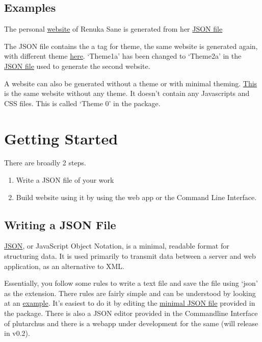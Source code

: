\documentclass[12pt]{article}
\begin{document}
    \subsection{Examples}

    The personal \href{http://latinplutarchus.com/saner}{website} of Renuka Sane is generated from her \href{http://latinplutarchus/saner_json}{JSON file}

    The JSON file contains the a tag for theme, the same website is generated again, with different theme \href{http://latinplutarchus/saner_json}{here}.  `Theme1a' has been changed to `Theme2a' in the \href{http://latinplutarchus/saner_json}{JSON file} used to generate the second website.  

    A website can also be generated without a theme or with minimal theming. \href{http://latinplutarchus/saner_json}{This} is the same website without any theme. It doesn't contain any Javascripts and CSS files. This is called `Theme 0' in the package.  
 

    \section{Getting Started}

    There are broadly 2 steps. 
    \begin{enumerate}
        \item Write a JSON file of your work
        \item Build website using it by using the web app or the Command Line Interface. 
    \end{enumerate}

    \subsection{Writing a JSON File}

    \href{https://developers.squarespace.com/what-is-json}{JSON}, or JavaScript Object Notation, is a minimal, readable format for structuring data. It is used primarily to transmit data between a server and web application, as an alternative to XML.

    Essentially, you follow some rules to write a text file and save the file using `json' as the extension. There rules are fairly simple and can be understood by looking at an \href{http://latinplutarchus/saner_json}{example}. It's easiest to do it by editing the \href{http://latinplutarchus/saner_json}{minimal JSON file} provided in the package.
    There is also a JSON editor provided in the Commandline Interface of plutarchus and there is a webapp under development for the same (will release in v0.2).  
\end{document}
